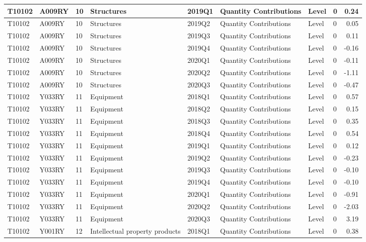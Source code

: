 \documentclass[
]{article}
\begin{document}
\begin{tabular}{l|l|l|l|l|l|l|l|r}
\hline
T10102 & A009RY & 10 & Structures & 2019Q1 & Quantity Contributions & Level & 0 & 0.24\\
\hline
T10102 & A009RY & 10 & Structures & 2019Q2 & Quantity Contributions & Level & 0 & 0.05\\
\hline
T10102 & A009RY & 10 & Structures & 2019Q3 & Quantity Contributions & Level & 0 & 0.11\\
\hline
T10102 & A009RY & 10 & Structures & 2019Q4 & Quantity Contributions & Level & 0 & -0.16\\
\hline
T10102 & A009RY & 10 & Structures & 2020Q1 & Quantity Contributions & Level & 0 & -0.11\\
\hline
T10102 & A009RY & 10 & Structures & 2020Q2 & Quantity Contributions & Level & 0 & -1.11\\
\hline
T10102 & A009RY & 10 & Structures & 2020Q3 & Quantity Contributions & Level & 0 & -0.47\\
\hline
T10102 & Y033RY & 11 & Equipment & 2018Q1 & Quantity Contributions & Level & 0 & 0.57\\
\hline
T10102 & Y033RY & 11 & Equipment & 2018Q2 & Quantity Contributions & Level & 0 & 0.15\\
\hline
T10102 & Y033RY & 11 & Equipment & 2018Q3 & Quantity Contributions & Level & 0 & 0.35\\
\hline
T10102 & Y033RY & 11 & Equipment & 2018Q4 & Quantity Contributions & Level & 0 & 0.54\\
\hline
T10102 & Y033RY & 11 & Equipment & 2019Q1 & Quantity Contributions & Level & 0 & 0.12\\
\hline
T10102 & Y033RY & 11 & Equipment & 2019Q2 & Quantity Contributions & Level & 0 & -0.23\\
\hline
T10102 & Y033RY & 11 & Equipment & 2019Q3 & Quantity Contributions & Level & 0 & -0.10\\
\hline
T10102 & Y033RY & 11 & Equipment & 2019Q4 & Quantity Contributions & Level & 0 & -0.10\\
\hline
T10102 & Y033RY & 11 & Equipment & 2020Q1 & Quantity Contributions & Level & 0 & -0.91\\
\hline
T10102 & Y033RY & 11 & Equipment & 2020Q2 & Quantity Contributions & Level & 0 & -2.03\\
\hline
T10102 & Y033RY & 11 & Equipment & 2020Q3 & Quantity Contributions & Level & 0 & 3.19\\
\hline
T10102 & Y001RY & 12 & Intellectual property products & 2018Q1 & Quantity Contributions & Level & 0 & 0.38\\

\end{tabular}
\end{document}
